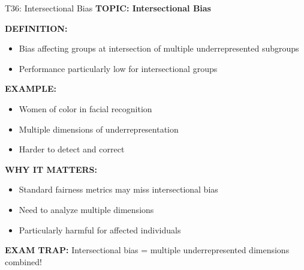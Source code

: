 \documentclass[8pt]{beamer}
\begin{document}
	\begin{frame}{T36: Intersectional Bias}
		\fontsize{6.5}{7.5}\selectfont
		\textbf{TOPIC: Intersectional Bias}
		
		\vspace{0.1cm}
		\textbf{DEFINITION:}
		\begin{itemize}
			\item Bias affecting groups at intersection of multiple underrepresented subgroups
			\item Performance particularly low for intersectional groups
		\end{itemize}
		
		\vspace{0.1cm}
		\textbf{EXAMPLE:}
		\begin{itemize}
			\item Women of color in facial recognition
			\item Multiple dimensions of underrepresentation
			\item Harder to detect and correct
		\end{itemize}
		
		\vspace{0.1cm}
		\textbf{WHY IT MATTERS:}
		\begin{itemize}
			\item Standard fairness metrics may miss intersectional bias
			\item Need to analyze multiple dimensions
			\item Particularly harmful for affected individuals
		\end{itemize}
		
		\textcolor{myred}{\textbf{EXAM TRAP:}} Intersectional bias = \textcolor{myblue}{multiple underrepresented dimensions combined}!
	\end{frame}
	
\end{document}
